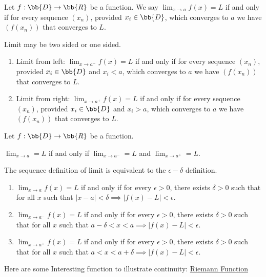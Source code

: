 \documentclass[../note.tex]{subfiles}
\begin{document}
\begin{definition}\label{SequenceDefinitionOfLimit}
	Let $f: \bb{D} \rightarrow \bb{R}$ be a function. 
	We say $\lim_{x \rightarrow a} f(x)=L$ if and only if for every sequence $(x_n)$, provided $x_i \in \bb{D}$, which converges to $a$ we have $(f(x_n))$ that converges to $L$.	
\end{definition}

\begin{definition}
	Limit may be two sided or one sided.
	\begin{enumerate}
	\item Limit from left: $\lim_{x \rightarrow a^-} f(x)=L$ if and only if for every sequence $(x_n)$, provided $x_i \in \bb{D}$ and $x_i<a$, which converges to $a$ we have $(f(x_n))$ that converges to $L$.
	\item Limit from right: $\lim_{x \rightarrow a^+} f(x)=L$ if and only if for every sequence $(x_n)$, provided $x_i \in \bb{D}$ and $x_i>a$, which converges to $a$ we have $(f(x_n))$ that converges to $L$.
	\end{enumerate}
\end{definition}

\begin{definition} 
\end{definition}

\begin{theorem}
	Let $f: \bb{D} \rightarrow \bb{R}$ be a function. 

	$\lim_{x \rightarrow a}=L$ if and only if $\lim_{x \rightarrow a^-}=L$ and $\lim_{x \rightarrow a^+}=L$.
\end{theorem}

\begin{theorem}
	The sequence definition of limit is equivalent to the $\epsilon-\delta$ definition.
	\begin{enumerate}
	\item $\lim_{x \rightarrow a} f(x)=L$ if and only if for every $\epsilon > 0$, there exists $\delta > 0$ such that for all $x$ such that $|x-a|<\delta \implies |f(x)-L|<\epsilon$.
	\item $\lim_{x \rightarrow a^-} f(x)=L$ if and only if for every $\epsilon > 0$, there exists $\delta > 0$ such that for all $x$ such that $a-\delta<x<a \implies |f(x)-L|<\epsilon$.
	\item $\lim_{x \rightarrow a^+} f(x)=L$ if and only if for every $\epsilon > 0$, there exists $\delta > 0$ such that for all $x$ such that $a<x<a+\delta \implies |f(x)-L|<\epsilon$.
	\end{enumerate}
\end{theorem}

Here are some Interesting function to illustrate continuity: \hyperlink{RiemannFunction}{Riemann Function}
\end{document}
